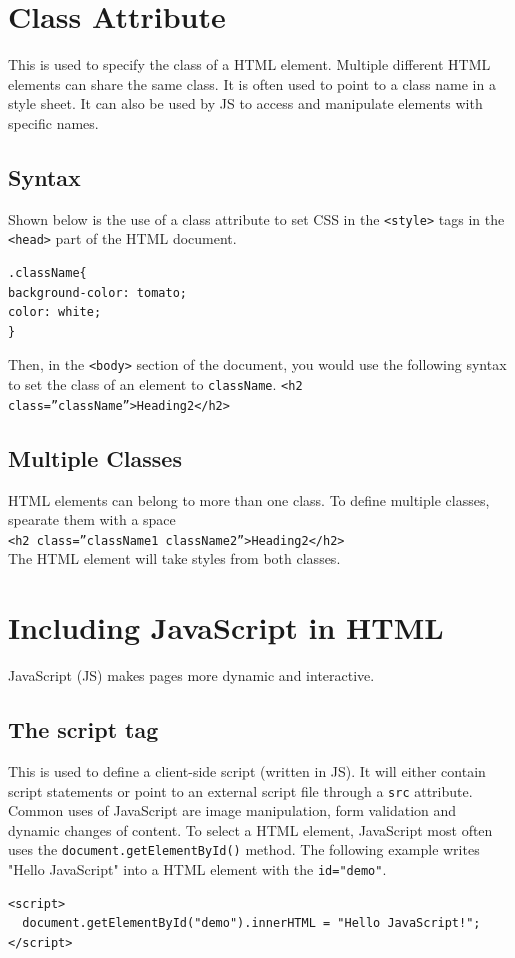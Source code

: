 \documentclass{thomasClass}
\begin{document}
\section{Class Attribute}
This is used to specify the class of a HTML element. Multiple different HTML elements can share the same class. It is often used to point to a class name in a style sheet. It can also be used by JS to access and manipulate elements with specific names. 
\subsection{Syntax}
Shown below is the use of a class attribute to set CSS in the \verb|<style>| tags in the \verb|<head>| part of the HTML document.
\begin{Verbatim}[breaklines=true, breakanywhere=true]
.className{
background-color: tomato;
color: white;
}
\end{Verbatim}
Then, in the \verb|<body>| section of the document, you would use the following syntax to set the class of an element to \verb|className|.
\verb|<h2 class=”className”>Heading2</h2>|
\subsection{Multiple Classes}
HTML elements can belong to more than one class. To define multiple classes, spearate them with a space\\
\verb|<h2 class=”className1 className2”>Heading2</h2>|\\
The HTML element will take styles from both classes.

\section{Including JavaScript in HTML}
JavaScript (JS) makes pages more dynamic and interactive.
\subsection{The script tag}
This is used to define a client-side script (written in JS). It will either contain script statements or point to an external script file through a \verb|src| attribute. Common uses of JavaScript are image manipulation, form validation and dynamic changes of content. To select a HTML element, JavaScript most often uses the \verb|document.getElementById()| method. The following example writes "Hello JavaScript" into a HTML element with the \verb|id="demo"|.
\begin{Verbatim}[breaklines=true, breakanywhere=true]
<script>
  document.getElementById("demo").innerHTML = "Hello JavaScript!";
</script>
\end{Verbatim}
\end{document}
